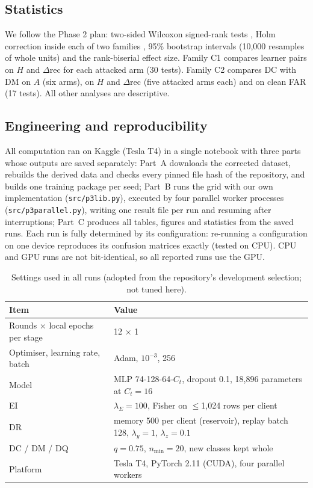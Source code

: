\documentclass[10pt,a4paper]{article}
\begin{document}
\subsection{Statistics}
We follow the Phase 2 plan: two-sided Wilcoxon signed-rank tests \cite{wilcoxon}, Holm correction inside each of two families \cite{holm}, 95\% bootstrap intervals (10,000 resamples of whole units) and the rank-biserial effect size. Family C1 compares learner pairs on $H$ and $\Delta$rec for each attacked arm (30 tests). Family C2 compares DC with DM on $A$ (six arms), on $H$ and $\Delta$rec (five attacked arms each) and on clean FAR (17 tests). All other analyses are descriptive.

\subsection{Engineering and reproducibility}
All computation ran on Kaggle (Tesla T4) in a single notebook with three parts whose outputs are saved separately: Part~A downloads the corrected dataset, rebuilds the derived data and checks every pinned file hash of the repository, and builds one training package per seed; Part~B runs the grid with our own implementation (\texttt{src/p3lib.py}), executed by four parallel worker processes (\texttt{src/p3parallel.py}), writing one result file per run and resuming after interruptions; Part~C produces all tables, figures and statistics from the saved runs. Each run is fully determined by its configuration: re-running a configuration on one device reproduces its confusion matrices exactly (tested on CPU). CPU and GPU runs are not bit-identical, so all reported runs use the GPU.

\begin{table}[htbp]
\centering\footnotesize
\caption{Settings used in all runs (adopted from the repository's development selection; not tuned here).}
\label{tab:hp}
\begin{tabularx}{\linewidth}{L{4.2cm}Y}
\toprule
Item & Value\\
\midrule
Rounds $\times$ local epochs per stage & 12 $\times$ 1\\
Optimiser, learning rate, batch & Adam, $10^{-3}$, 256\\
Model & MLP 74-128-64-$C_t$, dropout 0.1, 18,896 parameters at $C_t{=}16$\\
EI & $\lambda_E=100$, Fisher on $\le$1,024 rows per client\\
DR & memory 500 per client (reservoir), replay batch 128, $\lambda_y=1$, $\lambda_z=0.1$\\
DC / DM / DQ & $q=0.75$, $n_{\min}=20$, new classes kept whole\\
Platform & Tesla T4, PyTorch 2.11 (CUDA), four parallel workers\\
\bottomrule
\end{tabularx}
\end{table}
\end{document}
